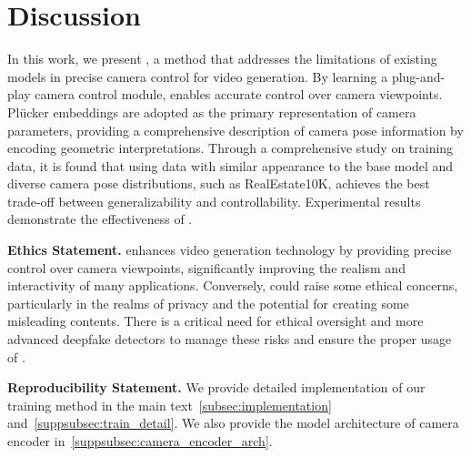 \section{Discussion}\label{sec:conclusion}

In this work, we present \method, a method that addresses the limitations of existing models in precise camera control for video generation. 
%
By learning a plug-and-play camera control module, \method enables accurate control over camera viewpoints. 
%
Plücker embeddings are adopted as the primary representation of camera parameters, providing a comprehensive description of camera pose information by encoding geometric interpretations. 
%
Through a comprehensive study on training data, it is found that using data with similar appearance to the base model and diverse camera pose distributions, such as RealEstate10K, achieves the best trade-off between generalizability and controllability.
%
Experimental results demonstrate the effectiveness of \method. 

\noindent \textbf{Ethics Statement.}
\method enhances video generation technology by providing precise control over camera viewpoints, significantly improving the realism and interactivity of many applications.
%
Conversely, \method could raise some ethical concerns, particularly in the realms of privacy and the potential for creating some misleading contents. 
%
There is a critical need for ethical oversight and more advanced deepfake detectors to manage these risks and ensure the proper usage of \method. 

\noindent \textbf{Reproducibility Statement.}
We provide detailed implementation of our training method in the main text~\cref{subsec:implementation} and~\cref{suppsubsec:train_detail}. 
%
We also provide the model architecture of camera encoder in~\cref{suppsubsec:camera_encoder_arch}. 